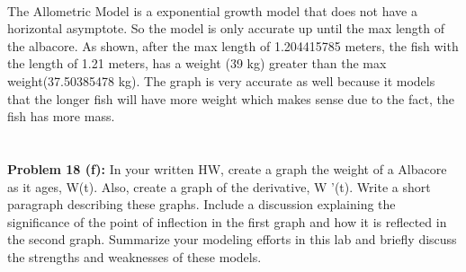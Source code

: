 \documentclass[12pt]{article}
\begin{document}
\\
\noindent The Allometric Model is a exponential growth model that does not have a horizontal asymptote.  So the model is only accurate up until the max length of the albacore. As shown, after the max length of 1.204415785 meters, the fish with the length of 1.21 meters, has a weight (39 kg) greater than the max weight(37.50385478 kg).  The graph is very accurate as well because it models that the longer fish will have more weight which makes sense due to the fact, the fish has more mass.
\\\\\\
\indent \textbf{Problem 18 (f): } In your written HW, create a graph the weight of a Albacore as it ages, W(t). Also, create a graph of the derivative, W '(t). Write a short paragraph describing these graphs. Include a discussion explaining the significance of the point of inflection in the first graph and how it is reflected in the second graph. Summarize your modeling efforts in this lab and briefly discuss the strengths and weaknesses of these models.
\end{document}
